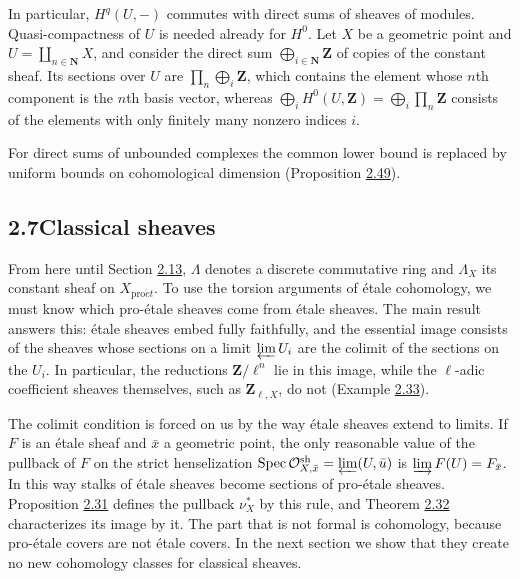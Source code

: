 \documentclass[11pt]{article}
\begin{document}
\label{bp86}%
In particular, \(H^q(U,-)\) commutes with direct sums of sheaves of modules. Quasi-compactness of \(U\) is needed already for \(H^0\). Let \(X\) be a geometric point and \(U=\coprod_{n\in\mathbf N}X\), and consider the direct sum \(\bigoplus_{i\in\mathbf N}\mathbf Z\) of copies of the constant sheaf. Its sections over \(U\) are \(\prod_n\bigoplus_i\mathbf Z\), which contains the element whose \(n\)th component is the \(n\)th basis vector, whereas \(\bigoplus_i H^0(U,\mathbf Z)=\bigoplus_i\prod_n\mathbf Z\) consists of the elements with only finitely many nonzero indices \(i\).

For direct sums of unbounded complexes the common lower bound is replaced by uniform bounds on cohomological dimension (Proposition \hyperref[bp144]{2.49}).


\subsection*{\texorpdfstring{2.7\quad Classical sheaves}{2.7 Classical sheaves}}
\label{bp87}%
\label{bp88}%
From here until Section \hyperref[bp168]{2.13}, \(\Lambda\) denotes a discrete commutative ring and \(\Lambda_X\) its constant sheaf on \(X_{\mathrm{pro}\acute{e}t}\). To use the torsion arguments of étale cohomology, we must know which pro-étale sheaves come from étale sheaves. The main result answers this: étale sheaves embed fully faithfully, and the essential image consists of the sheaves whose sections on a limit \(\varprojlim U_i\) are the colimit of the sections on the \(U_i\). In particular, the reductions \(\mathbf Z/\ell^n\) lie in this image, while the \(\ell\)-adic coefficient sheaves themselves, such as \(\mathbf Z_{\ell,X}\), do not (Example \hyperref[bp95]{2.33}).

The colimit condition is forced on us by the way étale sheaves extend to limits. If \(F\) is an étale sheaf and \(\bar x\) a geometric point, the only reasonable value of the pullback of \(F\) on the strict henselization \(\operatorname{Spec}\mathcal O^{\mathrm{sh}}_{X,\bar x}=\varprojlim(U,\bar u)\) is \(\varinjlim F(U)=F_{\bar x}\). In this way stalks of étale sheaves become sections of pro-étale sheaves. Proposition \hyperref[bp90]{2.31} defines the pullback \(\nu_X^*\) by this rule, and Theorem \hyperref[bp93]{2.32} characterizes its image by it. The part that is not formal is cohomology, because pro-étale covers are not étale covers. In the next section we show that they create no new cohomology classes for classical sheaves.
\end{document}
